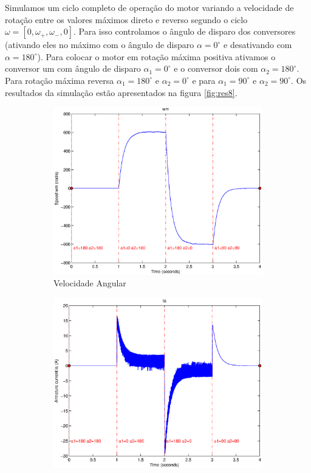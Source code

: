 \documentclass{article}
\begin{document}
Simulamos um ciclo completo de operação do motor variando a velocidade de rotação entre os valores máximos direto e reverso segundo o ciclo $\omega = [0,\omega_+,\omega_-, 0]$. Para isso controlamos o ângulo de disparo dos conversores (ativando eles no máximo com o ângulo de disparo $\alpha = 0^\circ$ e desativando com $\alpha = 180^\circ$). Para colocar o motor em rotação máxima positiva ativamos o conversor um com ângulo de disparo $\alpha_1 = 0^\circ$ e o conversor dois com $\alpha_2 = 180^\circ$. Para rotação máxima reversa $\alpha_1 = 180^\circ$ e $\alpha_2 = 0^\circ$ e para $\alpha_1 = 90^\circ$ e $\alpha_2 = 90^\circ$. Os resultados da simulação estão apresentados na figura \ref{fig:res8}.
\begin{figure}[H]
	\centering
	\begin{subfigure}[b]{0.49\linewidth}
		\includegraphics[width=\linewidth]{matlab/wm8}
		\caption{Velocidade Angular}
	\end{subfigure}
	\begin{subfigure}[b]{0.49\linewidth}
		\centering
		\includegraphics[width=\linewidth]{matlab/ia8}

\end{subfigure}
\end{figure}
\end{document}
